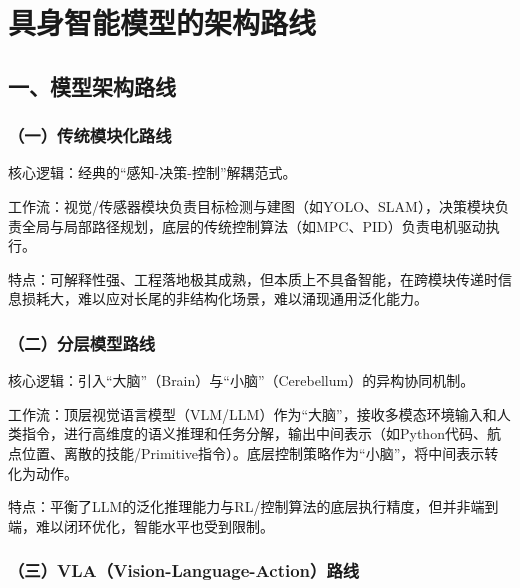 \setcounter{section}{0}

\hypertarget{ux5177ux8eabux667aux80fdux6a21ux578bux7684ux67b6ux6784ux8defux7ebf}{%
\section{具身智能模型的架构路线}\label{ux5177ux8eabux667aux80fdux6a21ux578bux7684ux67b6ux6784ux8defux7ebf}}

\hypertarget{ux4e00ux6a21ux578bux67b6ux6784ux8defux7ebf}{%
\subsection{一、模型架构路线}\label{ux4e00ux6a21ux578bux67b6ux6784ux8defux7ebf}}

\hypertarget{ux4e00ux4f20ux7edfux6a21ux5757ux5316ux8defux7ebf}{%
\subsubsection{（一）传统模块化路线}\label{ux4e00ux4f20ux7edfux6a21ux5757ux5316ux8defux7ebf}}

核心逻辑：经典的``感知-决策-控制''解耦范式。

工作流：视觉/传感器模块负责目标检测与建图（如YOLO、SLAM），决策模块负责全局与局部路径规划，底层的传统控制算法（如MPC、PID）负责电机驱动执行。

特点：可解释性强、工程落地极其成熟，但本质上不具备智能，在跨模块传递时信息损耗大，难以应对长尾的非结构化场景，难以涌现通用泛化能力。

\hypertarget{ux4e8cux5206ux5c42ux6a21ux578bux8defux7ebf}{%
\subsubsection{（二）分层模型路线}\label{ux4e8cux5206ux5c42ux6a21ux578bux8defux7ebf}}

核心逻辑：引入``大脑''（Brain）与``小脑''（Cerebellum）的异构协同机制。

工作流：顶层视觉语言模型（VLM/LLM）作为``大脑''，接收多模态环境输入和人类指令，进行高维度的语义推理和任务分解，输出中间表示（如Python代码、航点位置、离散的技能/Primitive指令）。底层控制策略作为``小脑''，将中间表示转化为动作。

特点：平衡了LLM的泛化推理能力与RL/控制算法的底层执行精度，但并非端到端，难以闭环优化，智能水平也受到限制。

\hypertarget{ux4e09vlavision-language-actionux8defux7ebf}{%
\subsubsection{（三）VLA（Vision-Language-Action）路线}\label{ux4e09vlavision-language-actionux8defux7ebf}}

